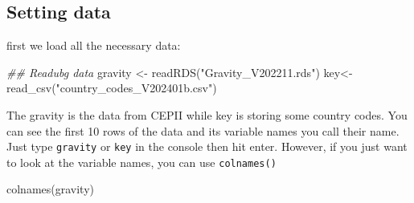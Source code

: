 \documentclass[
  a4paper,
  DIV=11,
  numbers=noendperiod]{scrreprt}
\newenvironment{Shaded}{\begin{snugshade}}{\end{snugshade}}
\newcommand{\DocumentationTok}[1]{\textcolor[rgb]{0.37,0.37,0.37}{\textit{#1}}}
\newcommand{\FunctionTok}[1]{\textcolor[rgb]{0.28,0.35,0.67}{#1}}
\newcommand{\NormalTok}[1]{\textcolor[rgb]{0.00,0.23,0.31}{#1}}
\newcommand{\OtherTok}[1]{\textcolor[rgb]{0.00,0.23,0.31}{#1}}
\newcommand{\StringTok}[1]{\textcolor[rgb]{0.13,0.47,0.30}{#1}}
\begin{document}
\hypertarget{setting-data}{%
\subsection{Setting data}\label{setting-data}}

first we load all the necessary data:

\begin{Shaded}
\begin{Highlighting}[numbers=left,,]
\DocumentationTok{\#\# Readubg data}
\NormalTok{gravity }\OtherTok{\textless{}{-}} \FunctionTok{readRDS}\NormalTok{(}\StringTok{"Gravity\_V202211.rds"}\NormalTok{)}
\NormalTok{key}\OtherTok{\textless{}{-}}\FunctionTok{read\_csv}\NormalTok{(}\StringTok{"country\_codes\_V202401b.csv"}\NormalTok{)}
\end{Highlighting}
\end{Shaded}

The gravity is the data from CEPII while key is storing some country
codes. You can see the first 10 rows of the data and its variable names
you call their name. Just type \texttt{gravity} or \texttt{key} in the
console then hit enter. However, if you just want to look at the
variable names, you can use \texttt{colnames()}

\begin{Shaded}
\begin{Highlighting}[]
\FunctionTok{colnames}\NormalTok{(gravity)}
\end{Highlighting}
\end{Shaded}
\end{document}
